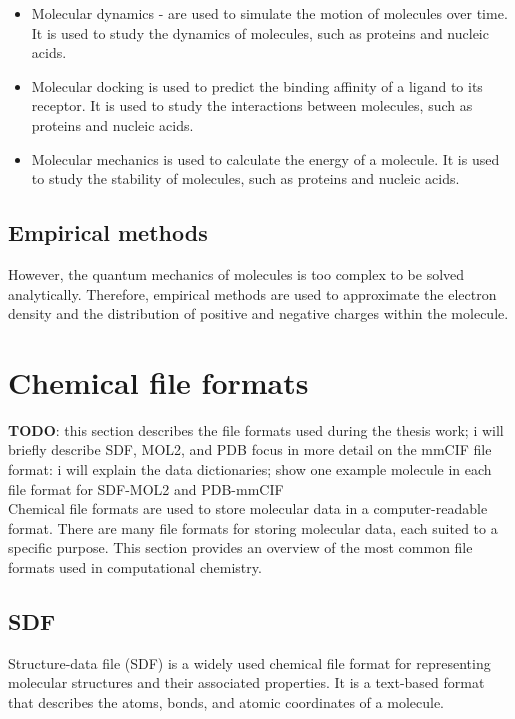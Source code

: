 \documentclass[
  digital,     %
  oneside,     %
  nosansbold,  %
  nocolorbold, %
  lof,         %
  lot,         %
]{fithesis4}
\begin{document}
\begin{itemize}
  \item Molecular dynamics - are used to simulate the motion of molecules over time. It is used to study the dynamics of molecules, such as proteins and nucleic acids.
  \item Molecular docking is used to predict the binding affinity of a ligand to its receptor. It is used to study the interactions between molecules, such as proteins and nucleic acids.
  \item Molecular mechanics is used to calculate the energy of a molecule. It is used to study the stability of molecules, such as proteins and nucleic acids.
\end{itemize}

\subsection{Empirical methods}
\label{subsection:empirical_methods}

However, the quantum mechanics of molecules is too complex to be solved analytically. Therefore, empirical methods are used to approximate the electron density and the distribution of positive and negative charges within the molecule.

\section{Chemical file formats}
\label{section:chemical_file_formats}

\textbf{TODO}: this section describes the file formats used during the thesis work; i will briefly describe SDF, MOL2, and PDB focus in more detail on the mmCIF file format: i will explain the data dictionaries; show one example molecule in each file format for SDF-MOL2 and PDB-mmCIF \\

Chemical file formats are used to store molecular data in a computer-readable format. There are many file formats for storing molecular data, each suited to a specific purpose. This section provides an overview of the most common file formats used in computational chemistry.

\subsection{SDF}
\label{subsection:sdf}

Structure-data file (SDF) is a widely used chemical file format for representing molecular structures and their associated properties. It is a text-based format that describes the atoms, bonds, and atomic coordinates of a molecule. 
\end{document}
